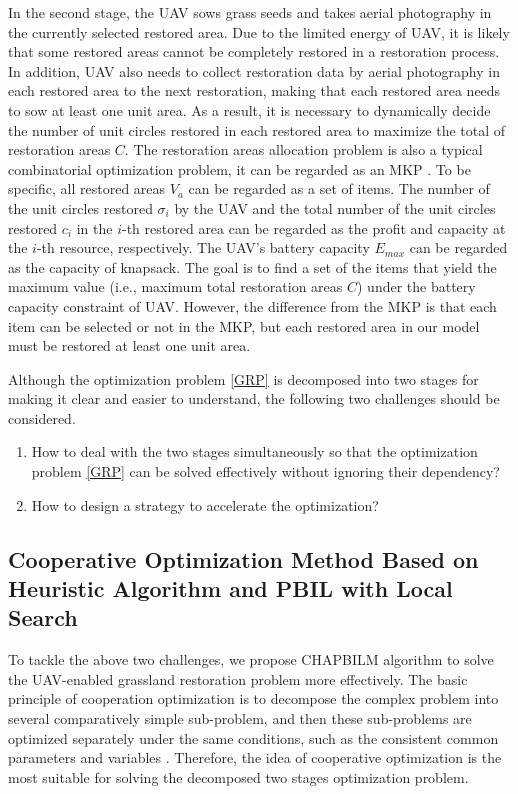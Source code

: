 \documentclass[preprint,5pt]{elsarticle}
\begin{document}
In the second stage, the UAV sows grass seeds and takes aerial photography in the currently selected restored area. Due to the limited energy of UAV, it is likely that some restored areas cannot be completely restored in a restoration process. In addition, UAV also needs to collect restoration data by aerial photography in each restored area to the next restoration, making that each restored area needs to sow at least one unit area. As a result, it is necessary to dynamically decide the number of unit circles restored in each restored area to maximize the total of restoration areas $C$. The restoration areas allocation problem is also a typical combinatorial optimization problem, it can be regarded as an MKP \cite{kellerer2004multidimensional}. To be specific, all restored areas $V_a$ can be regarded as a set of items. The number of the unit circles restored $\sigma_i$ by the UAV and the total number of the unit circles restored $c_i$ in the $i$-th restored area can be regarded as the profit and capacity at the $i$-th resource, respectively. The UAV's battery capacity $E_{max}$ can be regarded as the capacity of knapsack. The goal is to find a set of the items that yield the maximum value (i.e., maximum  total restoration areas $C$) under the battery capacity constraint of UAV. However, the difference from the MKP is that each item can be selected or not in the MKP, but each restored area in our model must be restored at least one unit area.

Although the optimization problem \eqref{GRP} is decomposed into two stages for making it clear and easier to understand, the following two challenges should be considered.
\begin{enumerate}
  \item How to deal with the two stages simultaneously so that the optimization problem \eqref{GRP} can be solved effectively without ignoring their dependency?
  \item How to design a strategy to accelerate the optimization?
\end{enumerate}
\subsection{Cooperative Optimization Method Based on Heuristic Algorithm and PBIL with Local Search}
To tackle the above two challenges, we propose CHAPBILM algorithm to solve the UAV-enabled grassland restoration problem more effectively. The basic principle of cooperation optimization is to decompose the complex problem into several comparatively simple sub-problem, and then these sub-problems are optimized separately under the same conditions, such as the consistent common parameters and variables \cite{huang2004cooperative}. Therefore, the idea of cooperative optimization is the most suitable for solving the decomposed two stages optimization problem.
\end{document}
